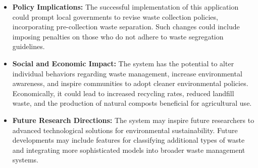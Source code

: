 \begin{itemize}
	\item \textbf{Policy Implications:} The successful implementation of this application could prompt local governments to revise waste collection policies, incorporating pre-collection waste separation. Such changes could include imposing penalties on those who do not adhere to waste segregation guidelines.
	
	\item \textbf{Social and Economic Impact:} The system has the potential to alter individual behaviors regarding waste management, increase environmental awareness, and inspire communities to adopt cleaner environmental policies. Economically, it could lead to increased recycling rates, reduced landfill waste, and the production of natural composts beneficial for agricultural use.
	
	\item \textbf{Future Research Directions:} The system may inspire future researchers to advanced technological solutions for environmental sustainability. Future developments may include features for classifying additional types of waste and integrating more sophisticated models into broader waste management systems.
\end{itemize}